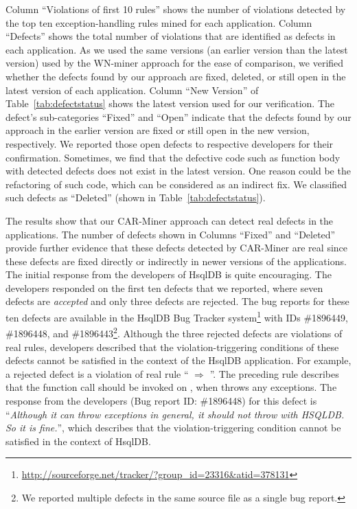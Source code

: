 Column ``Violations of first 10 rules'' shows the number of violations
detected by the top ten exception-handling rules mined for each application. 
Column ``Defects'' shows the total number of violations that are identified
as defects in each application. As we used the same versions 
(an earlier version than the latest version)
used by the WN-miner approach for the ease of comparison, 
we verified whether the defects found by our approach are fixed,
deleted, or still open in the latest version of each application. 
Column ``New Version'' of Table~\ref{tab:defectstatus}
shows the latest version used for our verification. 
The defect's sub-categories ``Fixed'' and ``Open'' indicate
that the defects found by our approach in the earlier version are fixed or still open
in the new version, respectively. We reported those open defects to respective
developers for their confirmation. Sometimes, we find that the defective code such as function
body with detected defects does not exist in the latest version.
One reason could be the refactoring of such code, which can be considered 
as an indirect fix. We classified such defects as ``Deleted'' (shown 
in Table~\ref{tab:defectstatus}). 

The results show that our CAR-Miner approach can detect real defects
in the applications. The number of defects shown in Columns ``Fixed''
and ``Deleted'' provide further evidence that these defects detected by CAR-Miner are real
since these defects are fixed directly or indirectly in newer versions of the applications.
The initial response from the developers of HsqlDB is quite
encouraging. The developers responded on the first ten defects that we reported, 
where seven defects are \emph{accepted} and only three defects are rejected.
The bug reports for these ten defects are available in the HsqlDB Bug Tracker
system\footnote{\url{http://sourceforge.net/tracker/?group_id=23316&atid=378131}}
with IDs \#1896449, \#1896448, and \#1896443\footnote{We reported multiple 
defects in the same source file as a single bug report.}.
Although the three rejected defects are 
violations of real rules, developers described that the violation-triggering
conditions of these defects cannot be satisfied in the context of the HsqlDB application.
For example, a rejected defect is a violation of real rule ``
$\Rightarrow$ ''. The preceding rule describes
that the  function call should be invoked on ,
when  throws any exceptions. The response from the 
developers (Bug report ID: \#1896448) for this defect is 
``\emph{Although it can throw exceptions in general, it should not throw with
HSQLDB. So it is fine.}'', which describes that the violation-triggering
condition cannot be satisfied in the context of HsqlDB.

